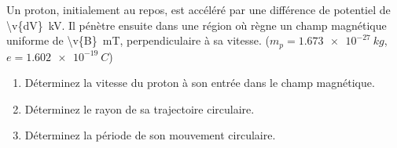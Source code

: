 Un proton, initialement au repos, est accéléré par une différence de potentiel de \qty{\v{dV}}{kV}. Il pénètre ensuite dans une région où règne un champ magnétique uniforme de \qty{\v{B}}{mT}, perpendiculaire à sa vitesse. ($m_p = \qty{1.673e-27}{kg}$, $e = \qty{1.602e-19}{C}$)

\begin{enumerate}[label=\alph*)]
    \item Déterminez la vitesse du proton à son entrée dans le champ magnétique.
    \item Déterminez le rayon de sa trajectoire circulaire.
    \item Déterminez la période de son mouvement circulaire.
\end{enumerate}
